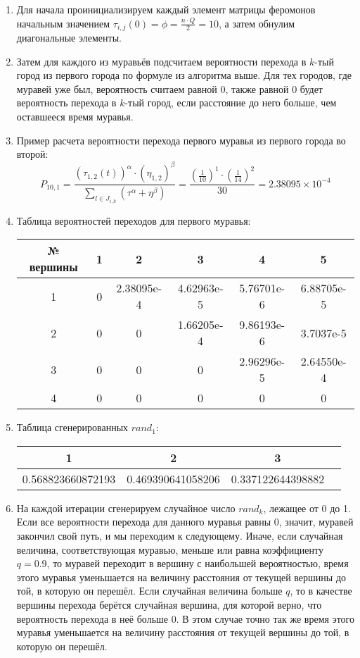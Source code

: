 \documentclass[14pt]{article}
\begin{document}
\begin{enumerate}
    \item Для начала проинициализируем каждый элемент матрицы феромонов начальным значением $\tau_{i,j}(0) = \phi = \frac{n \cdot Q}{2} = 10$, а затем обнулим диагональные элементы.
    \item Затем для каждого из муравьёв подсчитаем вероятности перехода в $k$-тый город из первого города по формуле из алгоритма выше. Для тех городов, где муравей уже был, вероятность считаем равной 0, также равной 0 будет вероятность перехода в $k$-тый город, если расстояние до него больше, чем оставшееся время муравья.
    \item Пример расчета вероятности перехода первого муравья из первого города во второй:
    \[
    P_{10,1} = \frac{(\tau_{1,2}(t))^\alpha \cdot (\eta_{1,2})^\beta}{\sum_{l \in J_{i,k}}(\tau^\alpha+\eta^\beta)} = \frac{\left(\frac{1}{10}\right)^1 \cdot \left(\frac{1}{14}\right)^2}{30} = 2.38095 \times 10^{-4}
    \]
    
    \item Таблица вероятностей переходов для первого муравья:\\
    \begin{tabular}{|c|c|c|c|c|c|}
        \hline
        № вершины & 1 & 2 & 3 & 4 & 5 \\
        \hline
        1 & 0 & 2.38095e-4 & 4.62963e-5 & 5.76701e-6 & 6.88705e-5 \\
        2 & 0 & 0 & 1.66205e-4 & 9.86193e-6 & 3.7037e-5 \\
        3 & 0 & 0 & 0 & 2.96296e-5 & 2.64550e-4 \\
        4 & 0 & 0 & 0 & 0 & 0 \\
        \hline
    \end{tabular}
    \item Таблица сгенерированных $rand_1$:\\
    \begin{tabular}{|c|c|c|c|}
        \hline
        1 & 2 & 3 \\
        \hline
        0.568823660872193 & 0.469390641058206 & 0.337122644398882 \\
        \hline
    \end{tabular}
    \item На каждой итерации сгенерируем случайное число $rand_k$, лежащее от 0 до 1. Если все вероятности перехода для данного муравья равны 0, значит, муравей закончил свой путь, и мы переходим к следующему. Иначе, если случайная величина, соответствующая муравью, меньше или равна коэффициенту $q = 0.9$, то муравей переходит в вершину с наибольшей вероятностью, время этого муравья уменьшается на величину расстояния от текущей вершины до той, в которую он перешёл. Если случайная величина больше $q$, то в качестве вершины перехода берётся случайная вершина, для которой верно, что вероятность перехода в неё больше 0. В этом случае точно так же время этого муравья уменьшается на величину расстояния от текущей вершины до той, в которую он перешёл.
    

\end{enumerate}
\end{document}
